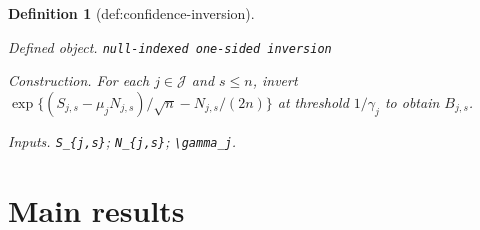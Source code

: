 \documentclass{article}
\newtheorem{definition}{Definition}
\begin{document}
\begin{definition}[def:confidence-inversion]\label{def:confidence-inversion}
\par\smallskip\noindent\emph{Defined object.} \texttt{null-\allowbreak{}indexed one-\allowbreak{}sided inversion}
\par\smallskip\noindent\emph{Construction.} For each \(j\in\mathcal J\) and \(s\leq n\), invert \(\exp\{(S_{j,s}-\mu_j N_{j,s})/\sqrt n-N_{j,s}/(2n)\}\) at threshold \(1/\gamma_j\) to obtain \(B_{j,s}\).
\par\smallskip\noindent\emph{Inputs.} \texttt{S\_\allowbreak{}\{j,\allowbreak{}s\}\allowbreak{}}; \texttt{N\_\allowbreak{}\{j,\allowbreak{}s\}\allowbreak{}}; \texttt{\textbackslash{}\allowbreak{}gamma\_\allowbreak{}j}.
\end{definition}

\section{Main results}
\end{document}

